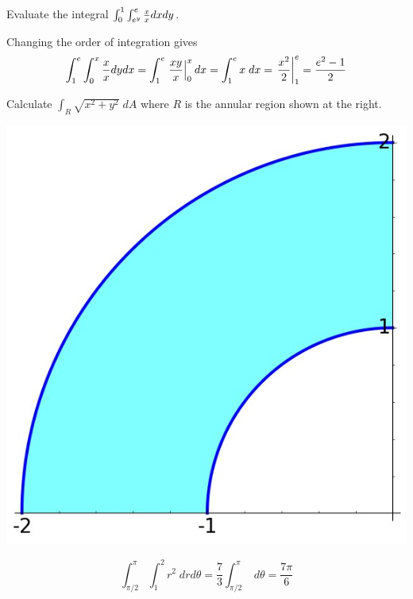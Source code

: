 \documentclass[answers,12pt,addpoints]{exam}
\let\ln\relax\DeclareMathOperator{\ln}{\mathsf{ln}}
\begin{document}
\begin{questions}

\question[25] Evaluate the integral
$\int_0^1\int_{e^y}^e\frac{x}{\ln{x}}dxdy$.
\begin{solution}
Changing the order of integration gives
\[\int_1^e\int_0^{\ln{x}}\frac{x}{\ln{x}}dydx
=\int_1^e\left.\frac{xy}{\ln{x}}\right|_0^{\ln{x}}dx
=\int_1^ex\;dx=\left.\frac{x^2}{2}\right|_1^e
=\frac{e^2-1}{2}\]
\end{solution}
\ifprintanswers\else\newpage\fi

\begin{multicols}{2}
\question[25] Calculate $\int_R\sqrt{x^2+y^2}\;dA$ where $R$
is the annular region shown at the right.
\begin{center}\includegraphics[scale=.25]{WasherWedge}\end{center}
\end{multicols}
\begin{solution}
\[\int_{\pi/2}^\pi\int_1^2r^2\;drd\theta
=\frac{7}{3}\int_{\pi/2}^\pi\;d\theta=\frac{7\pi}{6}\]
\end{solution}
\ifprintanswers\else\newpage\fi


\end{questions}
\end{document}
